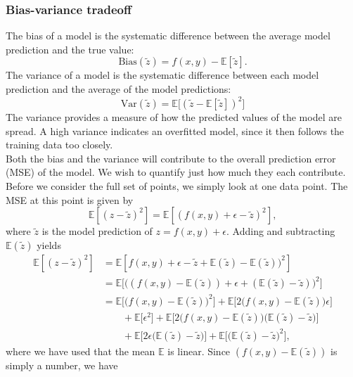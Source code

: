\documentclass[notitlepage, reprint, nofootinbib]{revtex4-1}
\begin{document}
\subsubsection{Bias-variance tradeoff}
The bias of a model is the systematic difference between the average model prediction and the true value:
\begin{equation}\label{bias}\text{Bias}(\tilde{z})=f(x,y)-\mathbb{E}[\tilde{z}].\end{equation}
The variance of a model is the systematic difference between each model prediction and the average of the model predictions:
\begin{equation}\label{var}\text{Var}(\tilde{z})=\mathbb{E}\big[(\tilde{z}-\mathbb{E}[\tilde{z}])^2\big]\end{equation}
The variance provides a measure of how the predicted values of the model are spread. A high variance indicates an overfitted model, since it then follows the training data too closely.\\[2mm]
Both the bias and the variance will contribute to the overall prediction error (MSE) of the model. We wish to quantify just how much they each contribute.\\[2mm]
Before we consider the full set of points, we simply look at one data point. The MSE at this point is given by
\begin{equation*}
	\mathbb{E}[(z-\tilde{z})^2]= \mathbb{E}[(f(x,y)+\epsilon-\tilde{z})^2],
\end{equation*}
where $\tilde{z}$ is the model prediction of $z=f(x,y)+\epsilon$. Adding and subtracting $\mathbb{E}(\tilde{z})$ yields
\begin{align*}
	\mathbb{E}[(z-\tilde{z})^2]&= \mathbb{E}[f(x,y)+\epsilon-\tilde{z}+\mathbb{E}(\tilde{z})-\mathbb{E}(\tilde{z}))^2]\\
	&=\mathbb{E}\Big[\big((f(x,y)-\mathbb{E}(\tilde{z}))+\epsilon+(\mathbb{E}(\tilde{z})-\tilde{z})\big)^2\Big]\\
	&=\mathbb{E}\Big[\big(f(x,y)-\mathbb{E}(\tilde{z})\big)^2\Big]+\mathbb{E}\Big[2\big(f(x,y)-\mathbb{E}(\tilde{z})\big)\epsilon\Big]\\
	&\quad\quad+\mathbb{E}\Big[\epsilon^2\Big] +\mathbb{E}\Big[2\big(f(x,y)-\mathbb{E}(\tilde{z})\big)\big(\mathbb{E}(\tilde{z})-\tilde{z}\big)\Big]\\
	&\quad\quad+\mathbb{E}\Big[2\epsilon\big(\mathbb{E}(\tilde{z})-\tilde{z}\big)\Big]+\mathbb{E}\Big[\big(\mathbb{E}(\tilde{z})-\tilde{z}\big)^2\Big],
\end{align*}
where we have used that the mean $\mathbb{E}$ is linear. Since $(f(x,y)-\mathbb{E}(\tilde{z}))$ is simply a number, we have 
\end{document}

